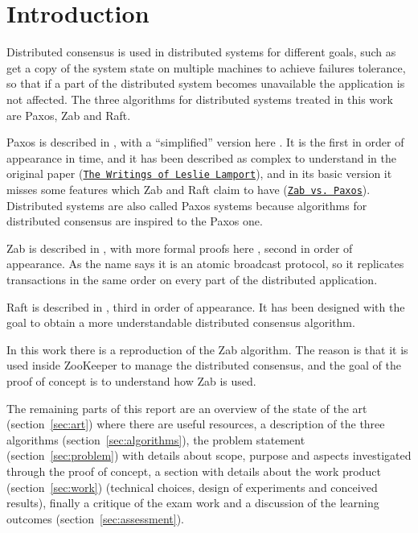 \chapter{Introduction\label{sec:introduction}}
Distributed consensus is used in distributed systems for different goals, such as get a copy of the system state on multiple machines to achieve failures tolerance, so that if a part of the distributed system becomes unavailable the application is not affected.
The three algorithms for distributed systems treated in this work are Paxos, Zab and Raft.

Paxos is described in \cite{leslie1998part}, with a ``simplified'' version here \cite{lamport2001paxos}. 
It is the first in order of appearance in time, and it has been described as complex to understand in the original paper (\href{http://lamport.azurewebsites.net/pubs/pubs.html#lamport-paxos}{\texttt{The Writings of Leslie Lamport}}), and in its basic version it misses some features which Zab and Raft claim to have (\href{https://cwiki.apache.org/confluence/display/ZOOKEEPER/Zab+vs.+Paxos}{\texttt{Zab vs.~Paxos}}). Distributed systems are also called Paxos systems because algorithms for distributed consensus are inspired to the Paxos one.

Zab is described in \cite{reed2008simple}, with more formal proofs here \cite{junqueira2011zab}, second in order of appearance. As the name says it is an atomic broadcast protocol, so it replicates transactions in the same order on every part of the distributed application.

Raft is described in \cite{ongaro2014search}, third in order of appearance. It has been designed with the goal to obtain a more understandable distributed consensus algorithm.

In this work there is a reproduction of the Zab algorithm. The reason is that it is used inside ZooKeeper to manage the distributed consensus, and the goal of the proof of concept is to understand how Zab is used.

The remaining parts of this report are an overview of the state of the art (section~\vref{sec:art}) where there are useful resources, a description of the three algorithms (section~\vref{sec:algorithms}), the problem statement (section~\vref{sec:problem}) with details about scope, purpose and aspects investigated through the proof of concept, a section with details about the work product (section~\vref{sec:work}) (technical choices, design of experiments and conceived results), finally a critique of the exam work and a discussion of the learning outcomes (section~\vref{sec:assessment}).